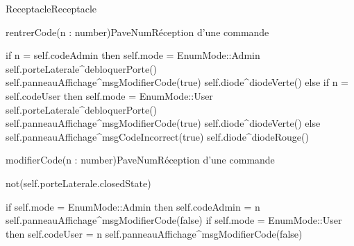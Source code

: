 \begin{OM}{Receptacle}{Receptacle}
    \begin{OMOperation}{rentrerCode(n : number)}{PaveNum}{Réception d'une commande}
        \begin{OMMessages}
        \end{OMMessages}
        \OMNoPre
        \begin{OMPost}
            if n = self.codeAdmin then
            self.mode = EnumMode::Admin
            self.porteLaterale^debloquerPorte()
            self.panneauAffichage^msgModifierCode(true)
            self.diode^diodeVerte()
            else if n = self.codeUser then
            self.mode = EnumMode::User
            self.porteLaterale^debloquerPorte()
            self.panneauAffichage^msgModifierCode(true)
            self.diode^diodeVerte()
            else
            self.panneauAffichage^msgCodeIncorrect(true)
            self.diode^diodeRouge()
        \end{OMPost}
    \end{OMOperation}

    \begin{OMOperation}{modifierCode(n : number)}{PaveNum}{Réception d'une commande}
        \begin{OMMessages}
        \end{OMMessages}
        \begin{OMPre}
            not(self.porteLaterale.closedState)
        \end{OMPre}
        \begin{OMPost}
            if self.mode = EnumMode::Admin then
            self.codeAdmin = n
            self.panneauAffichage^msgModifierCode(false)
            if self.mode = EnumMode::User then
            self.codeUser = n
            self.panneauAffichage^msgModifierCode(false)
        \end{OMPost}
    \end{OMOperation}


\end{OM}
